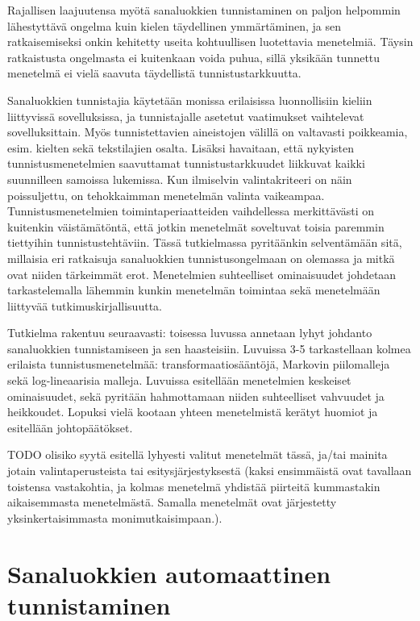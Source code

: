 \documentclass[utf8,bachelor,manualbib]{gradu3}
\begin{document}
Rajallisen laajuutensa myötä sanaluokkien tunnistaminen on paljon helpommin lähestyttävä ongelma kuin kielen täydellinen ymmärtäminen, ja sen ratkaisemiseksi onkin kehitetty useita kohtuullisen luotettavia menetelmiä. Täysin ratkaistusta ongelmasta ei kuitenkaan voida puhua, sillä yksikään tunnettu menetelmä ei vielä saavuta täydellistä tunnistustarkkuutta.

Sanaluokkien tunnistajia käytetään monissa erilaisissa luonnollisiin kieliin liittyvissä sovelluksissa, ja tunnistajalle asetetut vaatimukset vaihtelevat sovelluksittain. Myös tunnistettavien aineistojen välillä on valtavasti poikkeamia, esim. kielten sekä tekstilajien osalta. Lisäksi havaitaan, että nykyisten tunnistusmenetelmien saavuttamat tunnistustarkkuudet liikkuvat kaikki suunnilleen samoissa lukemissa. Kun ilmiselvin valintakriteeri on näin poissuljettu, on tehokkaimman menetelmän valinta vaikeampaa. Tunnistusmenetelmien toimintaperiaatteiden vaihdellessa merkittävästi on kuitenkin väistämätöntä, että jotkin menetelmät soveltuvat toisia paremmin tiettyihin tunnistustehtäviin. Tässä tutkielmassa pyritäänkin selventämään sitä, millaisia eri ratkaisuja sanaluokkien tunnistusongelmaan on olemassa ja mitkä ovat niiden tärkeimmät erot. Menetelmien suhteelliset ominaisuudet johdetaan tarkastelemalla lähemmin kunkin menetelmän toimintaa sekä menetelmään liittyvää tutkimuskirjallisuutta. 

Tutkielma rakentuu seuraavasti: toisessa luvussa annetaan lyhyt johdanto sanaluokkien tunnistamiseen ja sen haasteisiin. Luvuissa 3-5 tarkastellaan kolmea erilaista tunnistusmenetelmää: transformaatiosääntöjä, Markovin piilomalleja sekä log-lineaarisia malleja. Luvuissa esitellään menetelmien keskeiset ominaisuudet, sekä pyritään hahmottamaan niiden suhteelliset vahvuudet ja heikkoudet. Lopuksi vielä kootaan yhteen menetelmistä kerätyt huomiot ja esitellään johtopäätökset.

TODO olisiko syytä esitellä lyhyesti valitut menetelmät tässä, ja/tai mainita jotain valintaperusteista tai esitysjärjestyksestä (kaksi ensimmäistä ovat tavallaan toistensa vastakohtia, ja kolmas menetelmä yhdistää piirteitä kummastakin aikaisemmasta menetelmästä. Samalla menetelmät ovat järjestetty yksinkertaisimmasta monimutkaisimpaan.).


\chapter{Sanaluokkien automaattinen tunnistaminen}
\end{document}
